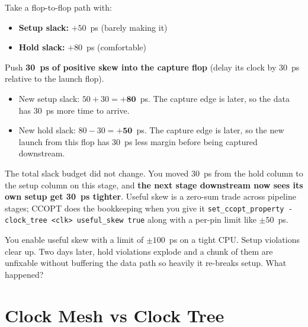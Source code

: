 Take a flop-to-flop path with:

\begin{itemize}
  \item \textbf{Setup slack:} $+50$~ps (barely making it)
  \item \textbf{Hold slack:} $+80$~ps (comfortable)
\end{itemize}

Push \textbf{30~ps of positive skew into the capture flop} (delay its clock by 30~ps relative to the launch flop).

\begin{itemize}
  \item New setup slack: $50 + 30 = \mathbf{+80}$~ps. The capture edge is later, so the data has 30~ps more time to arrive.
  \item New hold slack: $80 - 30 = \mathbf{+50}$~ps. The capture edge is later, so the new launch from this flop has 30~ps less margin before being captured downstream.
\end{itemize}

The total slack budget did not change. You moved 30~ps from the hold column to the setup column on this stage, and \textbf{the next stage downstream now sees its own setup get 30~ps tighter}. Useful skew is a zero-sum trade across pipeline stages; CCOPT does the bookkeeping when you give it \texttt{set\_ccopt\_property -clock\_tree <clk> useful\_skew true} along with a per-pin limit like $\pm 50$~ps.

\begin{gut}
You enable useful skew with a limit of $\pm 100$~ps on a tight CPU. Setup violations clear up. Two days later, hold violations explode and a chunk of them are unfixable without buffering the data path so heavily it re-breaks setup. What happened?
\end{gut}

\section{Clock Mesh vs Clock Tree}

